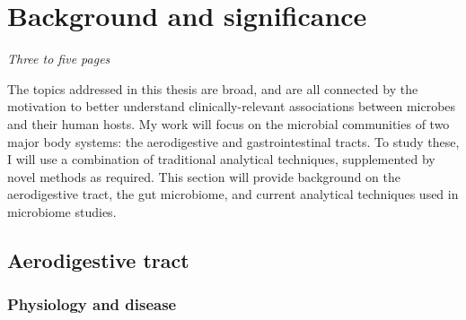 \documentclass[12pt]{article}
\begin{document}
\section{Background and significance}
\textit{Three to five pages}

The topics addressed in this thesis are broad, and are all connected by
the motivation to better understand
clinically-relevant associations between microbes and their human hosts.
My work will focus on the microbial communities of two major body systems:
the aerodigestive and gastrointestinal tracts. To study these, I will 
use a combination of traditional analytical techniques, supplemented by 
novel methods as required. This section will provide background on
the aerodigestive tract, the gut microbiome, and current analytical techniques 
used in microbiome studies. 

\subsection{Aerodigestive tract}

\subsubsection{Physiology and disease}
\end{document}
